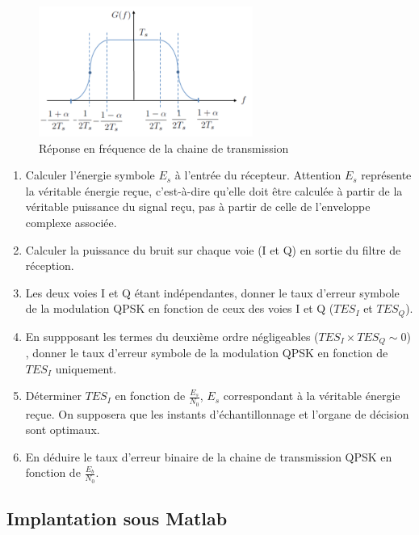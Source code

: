 \documentclass{article}
\begin{document}
\begin{figure}[h!]
\begin{center}
\includegraphics[width=7cm]{RCF.PNG}
\end{center}
\caption{Réponse en fréquence de la chaine de transmission} \label{rcf}
\end{figure}

\begin{enumerate}
    \item Calculer l'énergie symbole $E_s$ à l'entrée du récepteur. Attention $E_s$ représente la véritable énergie reçue, c'est-à-dire qu'elle doit être calculée à partir de la véritable puissance du signal reçu, pas à partir de celle de l'enveloppe complexe associée.
   
        
    \item Calculer la puissance du bruit sur chaque voie (I et Q) en sortie du filtre de réception.
    \item Les deux voies I et Q étant indépendantes, donner le taux d'erreur symbole de la modulation QPSK en fonction de ceux des voies I et Q ($TES_I$ et $TES_Q$).
    \item En suppposant les termes du deuxième ordre négligeables ($TES_I \times TES_Q \sim 0$) , donner le taux d'erreur symbole de la modulation QPSK en fonction de $TES_I$ uniquement.
    \item Déterminer $TES_I$ en fonction de $\frac{E_s}{N_0}$, $E_s$ correspondant à la véritable énergie reçue. On supposera que les instants d'échantillonnage et l'organe de décision sont optimaux.
    \item En déduire le taux d'erreur binaire de la chaine de transmission QPSK en fonction de $\frac{E_b}{N_0}$.
\end{enumerate}

\subsection{Implantation sous Matlab}
\end{document}
